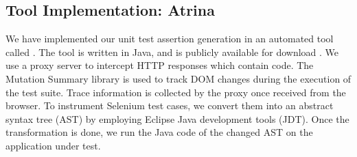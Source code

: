 \subsection{Tool Implementation: Atrina} \label{Sec:tool}

We have implemented our \javascript unit test assertion generation in an automated tool called \tool. The tool is written in Java, and is publicly available for download \cite{atrina-dl}.
We use a proxy server to intercept HTTP responses which contain \javascript code. The \javascript Mutation Summary library \cite{mutationSummary} is used to track DOM changes during the execution of the test suite. Trace information is collected by the proxy once received from the browser. To instrument Selenium test cases, we convert them into an abstract syntax tree (AST) by employing Eclipse Java development tools (JDT). Once the transformation is done, we run the Java code of the changed AST on the application under test.   

